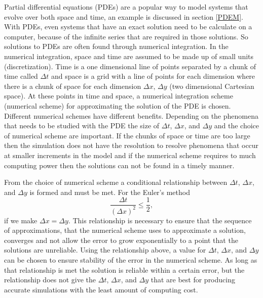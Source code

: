 Partial differential equations (PDEs) are a popular way to model systems that evolve over both space and time, an example is discussed in section \ref{PDEM}. With PDEs, even systems that have an exact solution need to be calculate on a computer, because of the infinite series that are required in those solutions. So solutions to PDEs are often found through numerical integration. In the numerical integration, space and time are assumed to be made up of small units (discretization). Time is a one dimensional line of points separated by a chunk of time called $\Delta t$ and space is a grid with a line of points for each dimension where there is a chunk of space for each dimension $\Delta x$, $\Delta y$ (two dimensional Cartesian space). At these points in time and space, a numerical integration scheme (numerical scheme) for approximating the solution of the PDE is chosen. Different numerical schemes have different benefits. Depending on the phenomena that needs to be studied with the PDE the size of $\Delta t$, $\Delta x$, and $\Delta y$ and the choice of numerical scheme are important. If the chunks of space or time are too large then the simulation does not have the resolution to resolve phenomena that occur at smaller increments in the model and if the numerical scheme requires to much computing power then the solutions can not be found in a timely manner.

From the choice of numerical scheme a conditional relationship between $\Delta t$, $\Delta x$, and $\Delta y$ is formed and must be met. For the Euler's method $$ \frac{\Delta t}{(\Delta x)^{2}} \leq \frac{1}{2},$$ if we make $\Delta x = \Delta y$.\citep{} This relationship is necessary to ensure that the sequence of approximations, that the numerical scheme uses to approximate a solution, converges and not allow the error to grow exponentially to a point that the solutions are unreliable. Using the relationship above, a value for $\Delta t$, $\Delta x$, and $\Delta y$ can be chosen to ensure stability of the error in the numerical scheme. As long as that relationship is met the solution is reliable within a certain error, but the relationship does not give the $\Delta t$, $\Delta x$, and $\Delta y$ that are best for producing accurate simulations with the least amount of computing cost.

